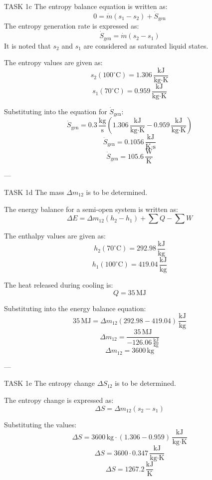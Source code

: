 TASK 1c  
The entropy balance equation is written as:  
\[
0 = \dot{m}(s_1 - s_2) + \dot{S}_{\text{gen}}
\]  
The entropy generation rate is expressed as:  
\[
\dot{S}_{\text{gen}} = \dot{m}(s_2 - s_1)
\]  
It is noted that \( s_2 \) and \( s_1 \) are considered as saturated liquid states.  

The entropy values are given as:  
\[
s_2 (100^\circ\text{C}) = 1.306 \, \frac{\text{kJ}}{\text{kg·K}}
\]  
\[
s_1 (70^\circ\text{C}) = 0.959 \, \frac{\text{kJ}}{\text{kg·K}}
\]  

Substituting into the equation for \( \dot{S}_{\text{gen}} \):  
\[
\dot{S}_{\text{gen}} = 0.3 \, \frac{\text{kg}}{\text{s}} \left( 1.306 \, \frac{\text{kJ}}{\text{kg·K}} - 0.959 \, \frac{\text{kJ}}{\text{kg·K}} \right)
\]  
\[
\dot{S}_{\text{gen}} = 0.1056 \, \frac{\text{kJ}}{\text{K·s}}
\]  
\[
\dot{S}_{\text{gen}} = 105.6 \, \frac{\text{W}}{\text{K}}
\]  

---

TASK 1d  
The mass \( \Delta m_{12} \) is to be determined.  

The energy balance for a semi-open system is written as:  
\[
\Delta E = \Delta m_{12}(h_2 - h_1) + \sum Q - \sum W
\]  

The enthalpy values are given as:  
\[
h_2 (70^\circ\text{C}) = 292.98 \, \frac{\text{kJ}}{\text{kg}}
\]  
\[
h_1 (100^\circ\text{C}) = 419.04 \, \frac{\text{kJ}}{\text{kg}}
\]  

The heat released during cooling is:  
\[
Q = 35 \, \text{MJ}
\]  

Substituting into the energy balance equation:  
\[
35 \, \text{MJ} = \Delta m_{12} (292.98 - 419.04) \, \frac{\text{kJ}}{\text{kg}}
\]  
\[
\Delta m_{12} = \frac{35 \, \text{MJ}}{-126.06 \, \frac{\text{kJ}}{\text{kg}}}
\]  
\[
\Delta m_{12} = 3600 \, \text{kg}
\]  

---

TASK 1e  
The entropy change \( \Delta S_{12} \) is to be determined.  

The entropy change is expressed as:  
\[
\Delta S = \Delta m_{12}(s_2 - s_1)
\]  

Substituting the values:  
\[
\Delta S = 3600 \, \text{kg} \cdot (1.306 - 0.959) \, \frac{\text{kJ}}{\text{kg·K}}
\]  
\[
\Delta S = 3600 \cdot 0.347 \, \frac{\text{kJ}}{\text{kg·K}}
\]  
\[
\Delta S = 1267.2 \, \frac{\text{kJ}}{\text{K}}
\]  